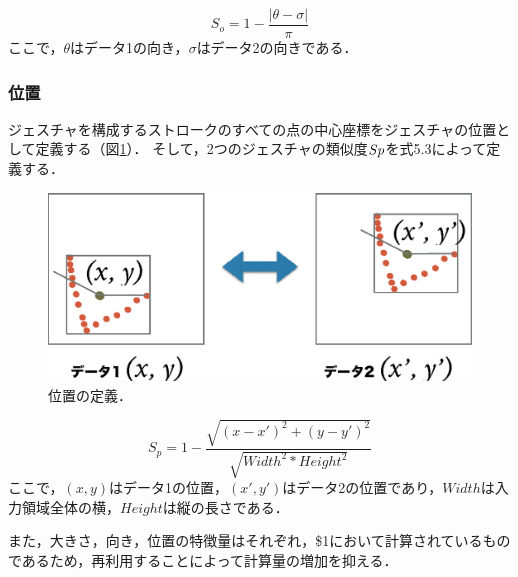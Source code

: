 \begin{equation}
S_\textit{o} = 1 - \frac{|\theta - \sigma|}{\pi}
\end{equation}
ここで，$\theta$はデータ1の向き，$\sigma$はデータ2の向きである．


\subsubsection{位置}
ジェスチャを構成するストロークのすべての点の中心座標をジェスチャの位置として定義する（図\ref{fig:v_position}）．
そして，2つのジェスチャの類似度$S{\scriptsize p}$を式5.3によって定義する．

\begin{figure} [h!]
	\begin{center}
		\includegraphics [width=0.6\hsize ]{img/v_position.eps}
	\end{center}
	\caption{位置の定義．}
	\label{fig:v_position}
\end{figure}


\begin{equation}
S_\textit{p} = 1 - \frac{\sqrt{(x - x')^2 + (y - y')^2}}{\sqrt{W\!idt\!h^2 * H\!ei\!ght^2}}
\end{equation}
ここで，$(x, y)$はデータ1の位置，$(x', y')$はデータ2の位置であり，$Width$は入力領域全体の横，$Height$は縦の長さである．

また，大きさ，向き，位置の特徴量はそれぞれ，\$1において計算されているものであるため，再利用することによって計算量の増加を抑える．

